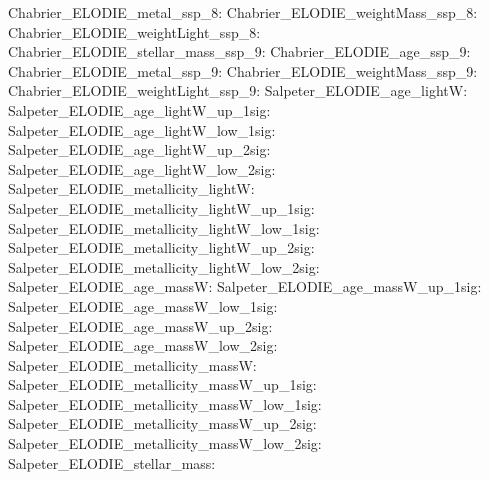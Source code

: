 Chabrier\_ELODIE\_metal\_ssp\_8:  \newline 
Chabrier\_ELODIE\_weightMass\_ssp\_8:  \newline 
Chabrier\_ELODIE\_weightLight\_ssp\_8:  \newline 
Chabrier\_ELODIE\_stellar\_mass\_ssp\_9:  \newline 
Chabrier\_ELODIE\_age\_ssp\_9:  \newline 
Chabrier\_ELODIE\_metal\_ssp\_9:  \newline 
Chabrier\_ELODIE\_weightMass\_ssp\_9:  \newline 
Chabrier\_ELODIE\_weightLight\_ssp\_9:  \newline 
Salpeter\_ELODIE\_age\_lightW:  \newline 
Salpeter\_ELODIE\_age\_lightW\_up\_1sig:  \newline 
Salpeter\_ELODIE\_age\_lightW\_low\_1sig:  \newline 
Salpeter\_ELODIE\_age\_lightW\_up\_2sig:  \newline 
Salpeter\_ELODIE\_age\_lightW\_low\_2sig:  \newline 
Salpeter\_ELODIE\_metallicity\_lightW:  \newline 
Salpeter\_ELODIE\_metallicity\_lightW\_up\_1sig:  \newline 
Salpeter\_ELODIE\_metallicity\_lightW\_low\_1sig:  \newline 
Salpeter\_ELODIE\_metallicity\_lightW\_up\_2sig:  \newline 
Salpeter\_ELODIE\_metallicity\_lightW\_low\_2sig:  \newline 
Salpeter\_ELODIE\_age\_massW:  \newline 
Salpeter\_ELODIE\_age\_massW\_up\_1sig:  \newline 
Salpeter\_ELODIE\_age\_massW\_low\_1sig:  \newline 
Salpeter\_ELODIE\_age\_massW\_up\_2sig:  \newline 
Salpeter\_ELODIE\_age\_massW\_low\_2sig:  \newline 
Salpeter\_ELODIE\_metallicity\_massW:  \newline 
Salpeter\_ELODIE\_metallicity\_massW\_up\_1sig:  \newline 
Salpeter\_ELODIE\_metallicity\_massW\_low\_1sig:  \newline 
Salpeter\_ELODIE\_metallicity\_massW\_up\_2sig:  \newline 
Salpeter\_ELODIE\_metallicity\_massW\_low\_2sig:  \newline 
Salpeter\_ELODIE\_stellar\_mass:  \newline 
